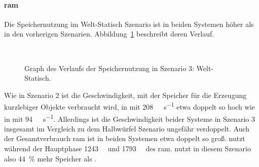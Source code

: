 \paragraph{\ac{ram}}
Die Speichernutzung im Welt-Statisch Szenario ist in beiden Systemen höher als in den vorherigen Szenarien. Abbildung~\ref{fig:seed-0-static-mem} beschreibt deren Verlauf. 
\begin{figure}[!htbp]
	\\
	\caption{Graph des Verlaufs der Speichernutzung in Szenario 3: Welt-Statisch.}\label{fig:seed-0-static-mem}
\end{figure} 
Wie in Szenario 2 ist die Geschwindigkeit, mit der Speicher für die Erzeugung kurzlebiger Objekte verbraucht wird, in \sysB{} mit \SI{208}{\mega\byte\per\second} etwa doppelt so hoch wie in \sysA{} mit \SI{94}{\mega\byte\per\second}. Allerdings ist die Geschwindigkeit beider Systeme in Szenario 3 insgesamt im Vergleich zu dem Halbwürfel Szenario ungefähr verdoppelt.
Auch der Gesamtverbrauch \ac{ram} ist in beiden Systemen etwa doppelt so groß. \sysA{} nutzt während der Hauptphase \SI{1243}{\mega\byte} und \sysB{} \SI{1793}{\mega\byte} des \ac{ram}. \sysB{} nutzt in diesem Szenario also \SI{44}{\percent} mehr Speicher als \sysA{}.   